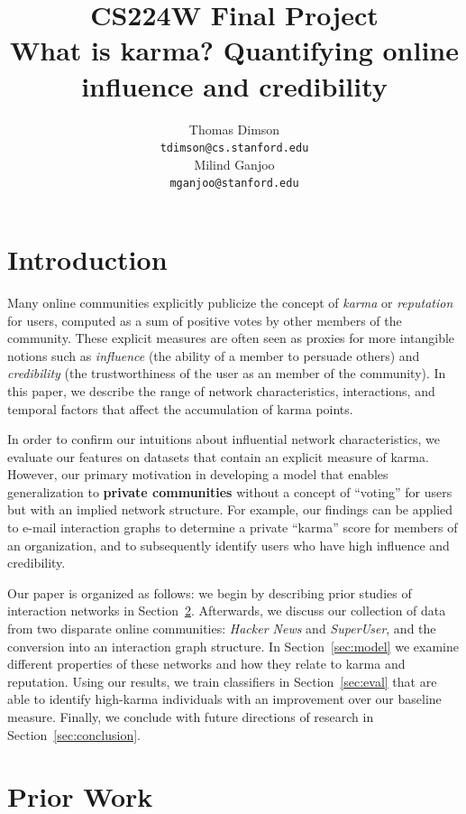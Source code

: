 \documentclass[11pt]{article}
\title{{\small CS224W Final Project} \\ What is karma? Quantifying online influence and credibility}
\author{Thomas Dimson \\
  {\tt tdimson@cs.stanford.edu}
  \\\And
  Milind Ganjoo \\
  {\tt mganjoo@stanford.edu}
}
\date{}
\begin{document}
\maketitle

\newcommand{\citet}[1]{\cite{#1}}

\section{Introduction}

Many online communities explicitly publicize the concept of \textit{karma} or
\textit{reputation} for users, computed as a sum of positive votes by other members of
the community. These explicit measures are often seen as proxies for more
intangible notions such as \textit{influence} (the ability of a member to
persuade others) and \textit{credibility} (the trustworthiness of the user as an
member of the community). In this paper, we describe the range of network
characteristics, interactions, and temporal factors that affect the accumulation
of karma points. 

In order to confirm our intuitions about influential network characteristics, 
we evaluate our features on datasets that contain an explicit
measure of karma. However, our primary motivation in developing a model that
enables generalization to \textbf{private communities} without a concept
of ``voting'' for users but with an implied network structure. For example, 
our findings can be applied to e-mail interaction graphs to 
determine a private ``karma'' score for members
of an organization, and to subsequently identify users who have high influence
and credibility.

Our paper is organized as follows: we begin by describing prior studies of
interaction networks in Section~\ref{sec:prior}. Afterwards, we discuss 
our collection of data from two disparate online communities: 
\textit{Hacker News} and \textit{SuperUser}, and the conversion into 
an interaction graph structure. In Section~\ref{sec:model} we 
examine different properties of these networks and
how they relate to karma and reputation. Using our results, we train
classifiers in Section~\ref{sec:eval} that are able to identify high-karma
individuals with an improvement over our baseline measure. Finally, we 
conclude with future directions of research in Section~\ref{sec:conclusion}.

\section{Prior Work}
\label{sec:prior}
\end{document}
